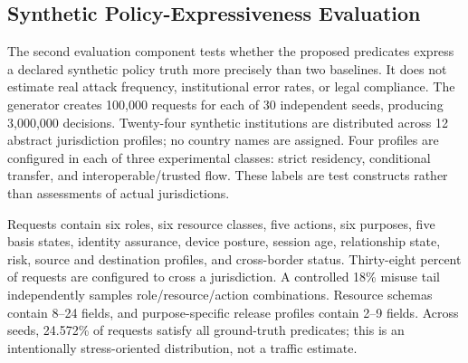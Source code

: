\documentclass[journal]{IEEEtran}
\begin{document}
\subsection{Synthetic Policy-Expressiveness Evaluation}
The second evaluation component tests whether the proposed predicates express a declared synthetic policy truth more precisely than two baselines. It does not estimate real attack frequency, institutional error rates, or legal compliance. The generator creates 100,000 requests for each of 30 independent seeds, producing 3,000,000 decisions. Twenty-four synthetic institutions are distributed across 12 abstract jurisdiction profiles; no country names are assigned. Four profiles are configured in each of three experimental classes: strict residency, conditional transfer, and interoperable/trusted flow. These labels are test constructs rather than assessments of actual jurisdictions.

Requests contain six roles, six resource classes, five actions, six purposes, five basis states, identity assurance, device posture, session age, relationship state, risk, source and destination profiles, and cross-border status. Thirty-eight percent of requests are configured to cross a jurisdiction. A controlled 18\% misuse tail independently samples role/resource/action combinations. Resource schemas contain 8--24 fields, and purpose-specific release profiles contain 2--9 fields. Across seeds, 24.572\% of requests satisfy all ground-truth predicates; this is an intentionally stress-oriented distribution, not a traffic estimate.
\end{document}
